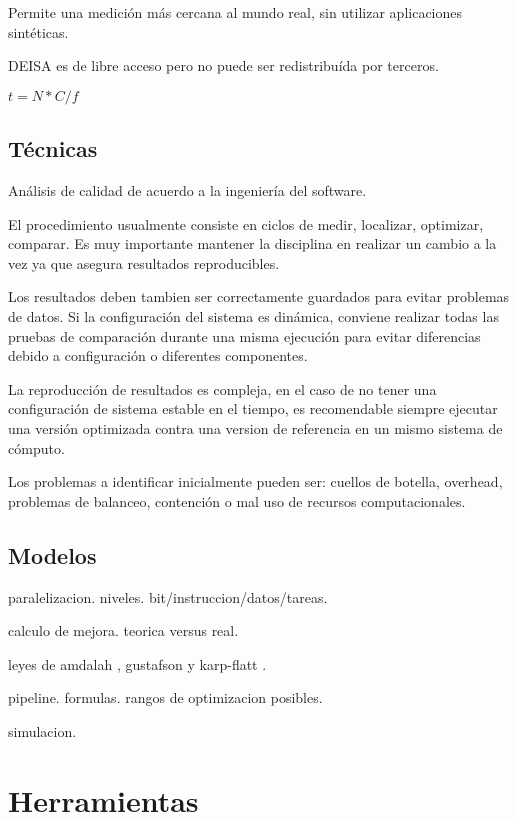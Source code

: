 \documentclass[a4paper]{report}
\begin{document}
Permite una medici\'on m\'as cercana al mundo real, sin utilizar aplicaciones sint\'eticas.

DEISA es de libre acceso pero no puede ser redistribu\'ida por terceros.

\bigskip

$ t = N * C / f $

\section{T\'ecnicas}

An\'alisis de calidad de acuerdo a la ingenier\'ia del software.

\bigskip

El procedimiento usualmente consiste en ciclos de medir, localizar, optimizar, comparar.
Es muy importante mantener la disciplina en realizar un cambio a la vez ya que asegura resultados reproducibles.

Los resultados deben tambien ser correctamente guardados para evitar problemas de datos.
Si la configuraci\'on del sistema es din\'amica, conviene realizar todas las pruebas de comparaci\'on durante una
misma ejecuci\'on para evitar diferencias debido a configuraci\'on o diferentes componentes.

\bigskip

La reproducci\'on de resultados es compleja, en el caso de no tener una configuraci\'on de sistema estable en el
tiempo, es recomendable siempre ejecutar una versi\'on optimizada contra una version de referencia en un mismo
sistema de c\'omputo.

\bigskip

Los problemas a identificar inicialmente pueden ser: cuellos de botella, overhead, problemas de balanceo,
contenci\'on o mal uso de recursos computacionales.

\section{Modelos}

paralelizacion. niveles. bit/instruccion/datos/tareas.

calculo de mejora. teorica versus real. 

leyes de amdalah \cite{amdahl}, gustafson \cite{gustafson} y karp-flatt \cite{karp-flatt}.

pipeline. formulas. rangos de optimizacion posibles.

simulacion.

\chapter{Herramientas}
\end{document}
